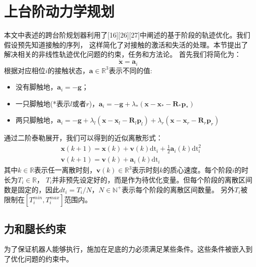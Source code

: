 \section{上台阶动力学规划}
本文中表述的跨台阶规划器利用了[16][26][27]中阐述的基于阶段的轨迹优化。我们假设预先知道接触的序列，
这样简化了对接触的激活和失活的处理。本节提出了解决相关的非线性轨迹优化问题的约束，任务和方法论。
首先我们将简化为：
\begin{equation}
    \label{equ:acceleration}
    \ddot{\boldsymbol{x}} = \boldsymbol{a}_i
\end{equation}
根据对应相位$i$的接触状态，$\boldsymbol{a} \in \mathbb{R}^{3}$表示不同的值:
\begin{itemize}
    \item 没有脚触地，$\boldsymbol{a}_i = -\boldsymbol{g}$；
    \item 一只脚触地(*表示$l$或者$r$)，$\boldsymbol{a}_i=-\boldsymbol{g}+\lambda_*\left(\boldsymbol{x}-\boldsymbol{x}_*-\boldsymbol{R}_* \boldsymbol{p}_*\right)$
    \item 两只脚触地，$\boldsymbol{a}_i=-\boldsymbol{g}+\lambda_l\left(\boldsymbol{x}-\boldsymbol{x}_l-\boldsymbol{R}_l \boldsymbol{p}_l\right)
                    +\lambda_r\left(\boldsymbol{x}-\boldsymbol{x}_r-\boldsymbol{R}_r \boldsymbol{p}_r\right)$
\end{itemize}
通过二阶泰勒展开，我们可以得到的近似离散形式：
\begin{equation}
    \label{equ:approx_acc}
    \begin{aligned}
        & \boldsymbol{x}(k+1)=\boldsymbol{x}(k)+\boldsymbol{v}(k) \mathrm{dt}_i+\frac{1}{2} \boldsymbol{a}_i(k) \mathrm{dt}_i^2 \\
        & \boldsymbol{v}(k+1)=\boldsymbol{v}(k)+\boldsymbol{a}_i(k) \mathrm{dt}_i
        \end{aligned}
\end{equation}
其中$k \in \mathbb{R}$表示任一离散时刻，$\boldsymbol{v}(k) \in \mathbb{R}^{3}$表示时刻$k$的质心速度。每个阶段$i$的时长为$T_i \in \mathbb{R}$，
$T_i$并非预先设定好的，而是作为待优化变量。但每个阶段的离散区间数是固定的，因此$dt_i=T_i/N$，$N\in \mathbb{N}^+$表示每个阶段的离散区间数量。
另外$T_i$被限制在$[T_i^{min}, T_i^{max}]$范围内。

\subsection{力和腿长约束}
\label{constraints}
为了保证机器人能够执行，施加在足底的力必须满足某些条件。这些条件被嵌入到了优化问题的约束中。

